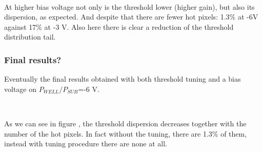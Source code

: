 \begin{figure}[h!]
\centering
{}\quad
{}\\
\label{fig:bias_comp}
\end{figure}

At higher bias voltage not only is the threshold lower (higher gain), but also its dispersion, as expected. And despite that there are fewer hot pixels: 1.3\% at -6V against 17\% at -3 V. Also here there is clear a reduction of the threshold distribution tail. 

\subsubsection{Final results?}

Eventually the final results obtained with both threshold tuning and a bias voltage on $P_{WELL}/P_{SUB}$=-6 V. 

\begin{figure}[h!]
\centering
{}\quad
{}\\
\label{fig:bias_tuning}
\end{figure}

As we can see in figure , the threshold dispersion decreases together with the number of the hot pixels. In fact without the tuning, there are 1.3\% of them, instead with tuning procedure there are none at all.






\begin{comment}
Suggestions from OBELIX meeting.

Probably the coupling is linked to digital power. 
Not from the bulk: +4 clk seems to be the indication for not a direct coupling

Since the distribution of the power is from the edge,  first and last column should be more solid against this effect and hot pixel should be more present in the center? 
They asked if we have a  map of the hot pixels

Also suggested to change the clock and see if the delay from the FREEZE edge is at the same delay or not. 

\end{comment}



